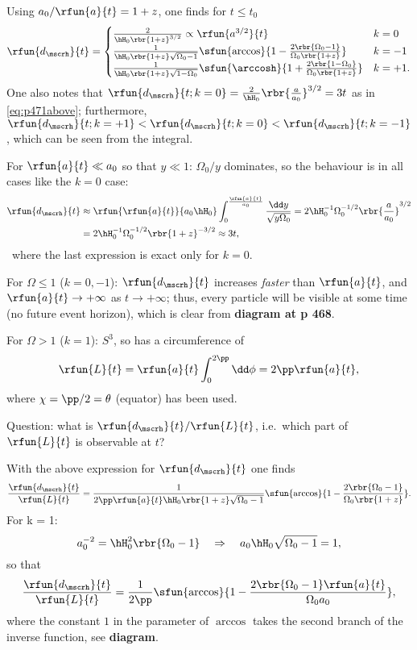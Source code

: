 Using $a_0/\rfun{a}{t} = 1+z$, one finds for $t \le t_0$
\begin{equation}
\rfun{d_\mscrh}{t} =
\begin{cases}
\frac{2}{\hH_0\rbr{1+z}^{3/2}} \propto \rfun{a^{3/2}}{t} & k = 0 \\
\frac{1}{\hH_0\rbr{1+z}\sqrt{\Omega_0-1}}\sfun{\arccos}{1- 
\frac{2\rbr{\Omega_0-1}}{\Omega_0\rbr{1+z}}} & k = -1 \\
\frac{1}{\hH_0\rbr{1+z}\sqrt{1-\Omega_0}}\sfun{\arccosh}{1+ 
\frac{2\rbr{1-\Omega_0}}{\Omega_0\rbr{1+z}}} & k = +1.
\end{cases}
\end{equation}
One also notes that $\rfun{d_\mscrh}{t; k = 0} = \frac{2}{\hH_0} 
\rbr{\frac{a}{a_0}}^{3/2} = 3t$ as in \cref{eq:p471above}; furthermore, 
$\rfun{d_\mscrh}{t; k = +1} < \rfun{d_\mscrh}{t; k = 0} < \rfun{d_\mscrh}{t; k 
= -1}$, which can be seen from the integral.

For $\rfun{a}{t} \ll a_0$ so that $y \ll 1$: $\Omega_0/y$ dominates, so the 
behaviour is in all cases like the $k=0$ case:
\begin{align}
\rfun{d_\mscrh}{t} &\approx \rfun{\rfun{a}{t}}{a_0\hH_0} 
\int_0^{\frac{\rfun{a}{t}}{a_0}}\frac{\dd y}{\sqrt{y\Omega_0}} =
2\hH_0^{-1}\Omega_0^{-1/2}\rbr{\frac{a}{a_0}}^{3/2} \nonumber \\
&= 2\hH_0^{-1}\Omega_0^{-1/2}\rbr{1+z}^{-3/2} \approx 3t,
\end{align}\
where the last expression is exact only for $k = 0$.

For $\Omega \le 1$ ($k = 0, -1$): $\rfun{d_\mscrh}{t}$ increases \emph{faster} 
than $\rfun{a}{t}$, and $\rfun{a}{t} \to +\infty$ as $t \to +\infty$; thus, 
every particle will be visible at some time (no future event horizon), which is 
clear from \textbf{diagram at p 468}.

For $\Omega > 1$ ($k = 1$): $S^3$, so has a circumference of
\begin{equation}
\rfun{L}{t} = \rfun{a}{t} \int_0^{2\pp}\dd\phi = 2\pp \rfun{a}{t},
\end{equation}
where $\chi = \pp/2 = \theta$ (equator) has been used.

Question: what is $\rfun{d_\mscrh}{t}/\rfun{L}{t}$, i.e.\ which part of 
$\rfun{L}{t}$ is observable at $t$?

With the above expression for $\rfun{d_\mscrh}{t}$ one finds
\begin{equation}
\frac{\rfun{d_\mscrh}{t}}{\rfun{L}{t}} = \frac{1}{2\pp\rfun{a}{t}\hH_0\rbr{1+z} 
\sqrt{\Omega_0-1}}\sfun{\arccos}{1-\frac{2\rbr{\Omega_0-1}}{\Omega_0\rbr{1+z}}}.
\end{equation}
For k = 1:
\begin{equation}
a_0^{-2} = \hH_0^2\rbr{\Omega_0-1}\quad\Rightarrow\quad
a_0\hH_0\sqrt{\Omega_0-1} = 1,
\end{equation}
so that
\begin{equation}
\frac{\rfun{d_\mscrh}{t}}{\rfun{L}{t}} = \frac{1}{2\pp} 
\sfun{\arccos}{1-\frac{2\rbr{\Omega_0-1}\rfun{a}{t}}{\Omega_0 a_0}},
\end{equation}
where the constant $1$ in the parameter of $\arccos$ takes the second branch of 
the inverse function, see \textbf{diagram}.

